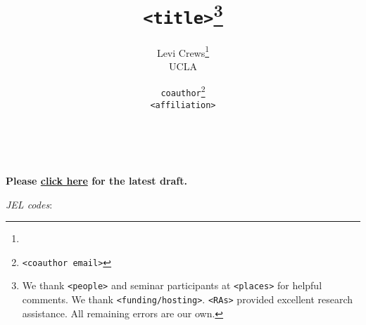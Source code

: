 \documentclass[11pt]{article}
\title{\textbf{\texttt{<title>}}\thanks{
    We thank \texttt{<people>} and seminar participants at \texttt{<places>}
    for helpful comments. We thank \texttt{<funding/hosting>}.
    \texttt{<RAs>} provided excellent research assistance.
    All remaining errors are our own.
}}
\author{
    Levi Crews\thanks{\crewsemail}\\ {UCLA}
    \and
    \texttt{coauthor}\thanks{\texttt{<coauthor email>}}\\ {\texttt{<affiliation>}}
}
\date{\the\day \ \monthname[\the\month] \the\year}
\begin{document}
\maketitle
\vspace{-2mm}
\begin{center}
    \textbf{Please \href{https://www.levicrews.com/files/p-<template>_paper.pdf}{click here} for the latest draft.}
\end{center}
\vspace{2mm}


\begin{abstract}
\noindent 
\end{abstract}
\vspace{0.5cm}
{\small
\noindent \textit{JEL codes}: 
}
\thispagestyle{empty}
\newpage
\setcounter{page}{1}


\end{document}
